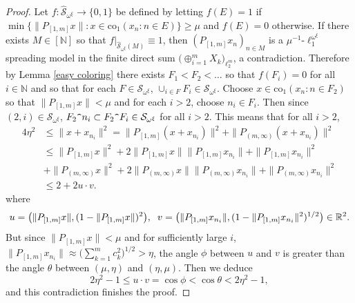 \documentclass[12pt]{amsart}
\theoremstyle{definition}
\newcommand{\infin}{[\mathbb{N}]}
\newcommand{\rr}{\mathbb{R}}
\newcommand{\nn}{\mathbb{N}}
\newcommand{\sss}{\mathcal{S}}
\begin{document}
\begin{proof}
Let $f:\widehat{\sss}_{\omega^\xi}\to \{0,1\}$ be defined by letting $f(E)=1$ if $\min \{\|P_{[1,m]}x\|: x\in \text{co}_1(x_n:n\in E)\}\geqslant \mu$ and $f(E)=0$ otherwise.  If there exists $M\in \infin$ so that $f|_{\widehat{\sss}_{\omega^\xi}(M)}\equiv 1$, then $(P_{[1,m]}x_n)_{n\in M}$ is a $\mu^{-1}$-$\ell_1^{\omega^\xi}$ spreading model in the finite direct sum $\bigl(\oplus_{i=1}^m X_k\bigr)_{\ell_2^m}$, a contradiction.  Therefore by Lemma \ref{easy coloring} there exists $F_1<F_2<\ldots$ so that $f(F_i)=0$ for all $i\in \nn$ and so that for each $F\in \sss_{\omega^\xi}$, $\cup_{i\in F}F_i\in \sss_{\omega^\xi}$.  Choose $x\in \text{co}_1(x_n:n\in F_2)$ so that $\|P_{[1,m]}x\|<\mu$ and for each $i>2$, choose $n_i\in F_i$.  Then since $(2, i)\in \sss_{\omega^\xi}$, $F_2\verb!^!n_i\subset F_2\verb!^!F_i\in \sss_{\omega^\xi}$ for all $i>2$.  This means that for all $i>2$, \begin{align*} 4\eta^2 & \leqslant \|x+x_{n_i}\|^2 = \|P_{[1,m]}(x+x_{n_i})\|^2+ \|P_{(m, \infty)}(x+x_{n_i})\|^2 \\ & \leqslant \|P_{[1,m]}x\|^2+ 2\|P_{[1,m]}x\|\|P_{[1,m]}x_{n_i}\|+\|P_{[1,m]}x_{n_i}\|^2 \\ & + \|P_{(m, \infty)}x\|^2+2\|P_{(m, \infty)}x\|\|P_{(m, \infty)}x_{n_i}\|+\|P_{(m, \infty)}x_{n_i}\|^2 \\ & \leqslant 2 + 2 u\cdot v.  \end{align*}
where $$u= \bigl( \|P_{[1,m]}x\|, (1- \|P_{[1,m]}x\|)^2\bigr), \hspace{2mm} v=  \bigl( \|P_{[1,m]}x_{n_i}\|,(1-\|P_{[1, m]}x_{n_i}\|^2)^{1/2}\bigr)\in \rr^2.$$ But since $\|P_{[1,m]}x\|<\mu $ and for sufficiently large $i$, $\|P_{[1,m]}x_{n_i}\|\approx \bigl(\sum_{k=1}^m c_k^2\bigr)^{1/2}>\eta$, the angle $\phi$ between $u$ and $v$ is greater than the angle $\theta$ between $(\mu, \eta)$ and $(\eta, \mu)$.  Then we deduce $$2\eta^2-1 \leqslant u\cdot v = \cos \phi < \cos \theta < 2\eta^2-1,$$ and this contradiction finishes the proof.   





\end{proof}
\end{document}
